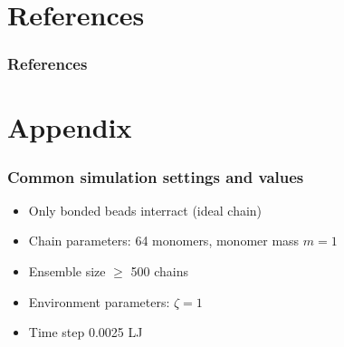 \documentclass[handout]{beamer}
\begin{document}
\section{References}


\begin{frame}
    \frametitle{References}
    
    
\end{frame}


\section{Appendix}

\begin{frame}
    \frametitle{Common simulation settings and values}

    \begin{itemize}
        \item Only bonded beads interract (ideal chain)
        \item Chain parameters: 64 monomers, monomer mass $m=1$
        \item Ensemble size $ \ge $ 500 chains
        \item Environment parameters: $\zeta=1$
        \item Time step 0.0025 LJ
    \end{itemize}

\end{frame}
\end{document}
